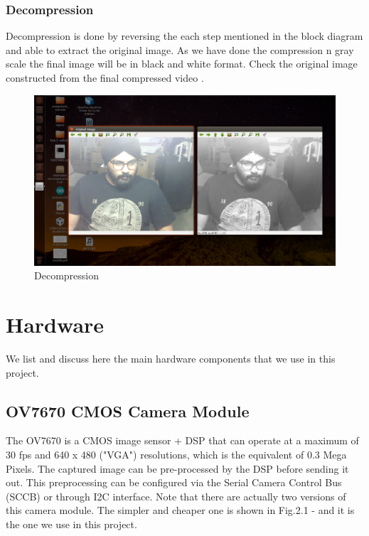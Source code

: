 \documentclass[a4paper]{article}
\begin{document}
\subsubsection{Decompression}

Decompression is done by reversing the each step mentioned in the block diagram and able to extract the original image. As we have done the compression n gray scale the final image will be in black and white format. Check the original image constructed from the final compressed video \cite{basic}.

\begin{figure}[H]
    \centering
    \includegraphics[scale=0.3]{image.png}
    \caption{Decompression}
    \label{fig:my_label}
\end{figure}
\section{Hardware}
We list and discuss here the main hardware components that we use in this project.
\subsection{OV7670 CMOS Camera Module}

The OV7670 is a CMOS image sensor + DSP that can operate at a maximum of 30 fps and 640 x 480 ("VGA") resolutions, which is the equivalent of 0.3 Mega Pixels. The captured image can be pre-processed by the DSP before sending it out. This preprocessing can be configured via the Serial Camera Control Bus (SCCB) or through I2C interface. Note that there are actually two versions of this camera module. The simpler and cheaper one is shown in Fig.2.1 - and it is the one we use in this project. 
\end{document}
